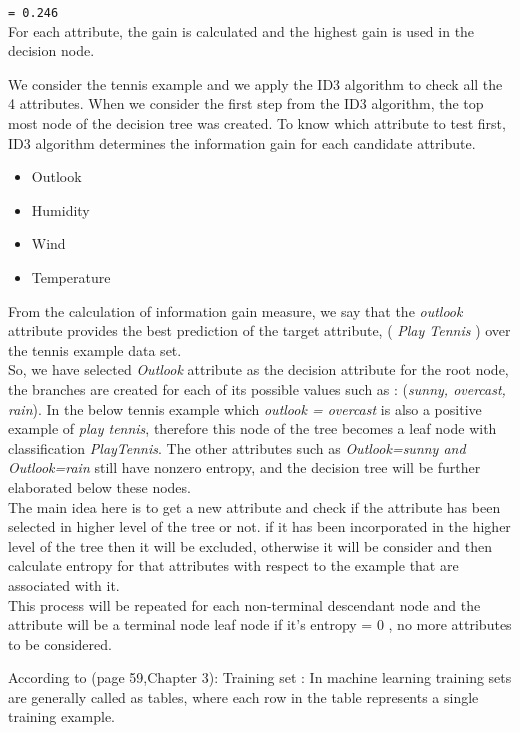 \documentclass{report}
\newcommand\textstyleTeletype[1]{\texttt{#1}}
\begin{document}
\textstyleTeletype{= 0.246}\\

For each attribute, the gain is calculated and the highest gain is used
in the decision node.

We consider the tennis example and we apply the ID3 algorithm to check all the 4 attributes.
When we consider the first step from the ID3 algorithm, the top most node of the decision tree was created. To know which attribute to test first, ID3 algorithm determines the information gain for each candidate attribute. 

\begin{itemize}
\item Outlook
\item Humidity
\item Wind
\item Temperature
\end{itemize}
\pagebreak
From the calculation of information gain measure, we say that the \emph{outlook} attribute provides the best prediction of the target attribute, ( \emph{Play Tennis} ) over the tennis example data set.\\
So, we have selected \emph{Outlook} attribute as the decision attribute for the root node, the branches are created for each of its possible values such as : (\emph{sunny, overcast, rain}).
In the below tennis example which \emph{outlook = overcast} is also a positive example of \emph{play tennis}, therefore this node of the tree becomes a leaf node with classification \emph{PlayTennis}. The other attributes such as \emph{Outlook=sunny and Outlook=rain} still have nonzero entropy, and the decision tree will be further elaborated below these nodes.\\

The main idea here is to get a new attribute and check if the attribute has been selected in higher level of the tree or not. if it has been incorporated in the higher level of the tree then it will be excluded, otherwise it will be consider and then calculate entropy for that attributes with respect to the example that are associated with it.\\
This process will be repeated for each non-terminal descendant node and the attribute will be a terminal node {leaf node} if it's entropy = 0 , no more attributes to be considered.

\pagebreak

According to \cite{Mitchell1997MachineLearning}(page 59,Chapter 3): Training set : In machine learning training sets are generally called as tables, where each row in the table represents a single training example. 
\end{document}
